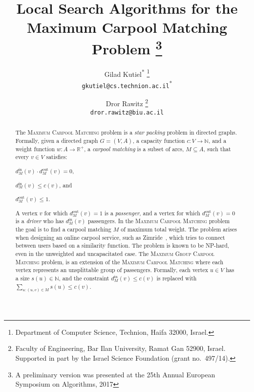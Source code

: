 \documentclass[11pt]{article}
\def\R{\mathbb{R}}
\def\N{\mathbb{N}}
\newcommand{\din}[1][M]{d^{\text{in}}_{#1}}
\newcommand{\dout}[1][M]{d^{\text{out}}_{#1}}
\newcommand{\carpool}{\textsc{Maximum Carpool Matching}\xspace}
\newcommand{\gcp}{\textsc{Maximum Group Carpool Matching}\xspace}
\begin{document}
\title{%
%
\textbf{Local Search Algorithms for the \\ Maximum Carpool Matching
  Problem}%
%
\thanks{A preliminary version was presented at the 25th Annual
  European Symposium on Algorithms, 2017}
%
}

\author{%
Gilad Kutiel\textsuperscript{*}%
\thanks{Department of Computer Science, Technion, Haifa 32000, Israel.} \\
\texttt{gkutiel@cs.technion.ac.il}\textsuperscript{*}
\and
Dror Rawitz%
\thanks{Faculty of Engineering, Bar Ilan University, Ramat Gan 52900, Israel.
Supported in part by the Israel Science Foundation (grant no.~497/14).} \\
\texttt{dror.rawitz@biu.ac.il}
}

\begin{titlepage}

\maketitle

\begin{abstract}
The \carpool problem is a \emph{star packing} problem in directed
graphs.  Formally, given a directed graph $G = (V, A)$, a capacity
function $c: V \rightarrow \N$, and a weight function $w:
A \rightarrow \R^+$, a \emph{carpool matching} is a subset of arcs,
$M \subseteq A$, such that every $v \in V$ satisfies:%
\begin{inparaenum}[(i)]
\item $\din[M](v) \cdot \dout[M](v) = 0$,
\item $\din[M](v) \leq c(v)$, and 
\item $\dout[M](v) \leq 1$.
\end{inparaenum}
A vertex $v$ for which $\dout[M](v) = 1$ is a \emph{passenger}, and a
vertex for which $\dout[M](v) = 0$ is a \emph{driver} who has
$\din[M](v)$ passengers.  In the \carpool problem the goal is to find
a carpool matching $M$ of maximum total weight.
%
The problem arises when designing an online carpool service, such as
Zimride~\cite{zimride}, which tries to connect between users based on
a similarity function.  The problem is known to be NP-hard, even in
the unweighted and uncapacitated case.
%
The \gcp problem, is an extension of the \carpool where each vertex
represents an unsplittable group of passengers.  Formally, each vertex
$u \in V$ has a size $s(u) \in \N$, and the constraint $\din(v) \leq
c(v)$ is replaced with $\sum_{u:(u,v) \in M} s(u) \leq c(v)$.


\end{abstract}
\end{titlepage}
\end{document}
